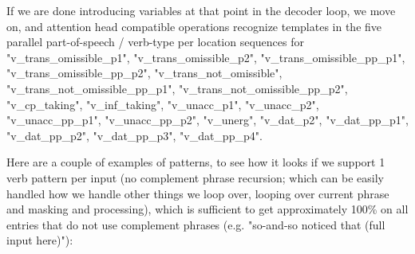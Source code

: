 \documentclass[11pt]{article}
\begin{document}
If we are done introducing variables at that point in the decoder loop, we move on, 
and attention head compatible operations recognize templates in the five parallel part-of-speech / verb-type per location sequences for "v\_trans\_omissible\_p1", "v\_trans\_omissible\_p2", "v\_trans\_omissible\_pp\_p1", "v\_trans\_omissible\_pp\_p2", "v\_trans\_not\_omissible", "v\_trans\_not\_omissible\_pp\_p1", "v\_trans\_not\_omissible\_pp\_p2", "v\_cp\_taking", "v\_inf\_taking", "v\_unacc\_p1", "v\_unacc\_p2", "v\_unacc\_pp\_p1", "v\_unacc\_pp\_p2", "v\_unerg", "v\_dat\_p2", "v\_dat\_pp\_p1", "v\_dat\_pp\_p2",  "v\_dat\_pp\_p3",  "v\_dat\_pp\_p4".

Here are a couple of examples of patterns, to see how it looks if we support 1 verb pattern per input (no complement phrase recursion; which can be easily handled how we handle other things we loop over, looping over current phrase and masking and processing), which is sufficient to get approximately 100\% on all entries that do not use complement phrases (e.g. "so-and-so noticed that (full input here)"):
\end{document}
